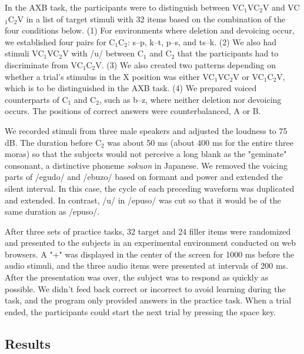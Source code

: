 \documentclass[a4paper,11pt,twocolumn]{article}
\begin{document}
In the AXB task, the participants were to distinguish between VC$_\text{1}$VC$_\text{2}$V and VC$_\text{1}$C$_\text{2}$V in a list of target stimuli with 32 items based on the combination of the four conditions below. (1) For environments where deletion and devoicing occur, we established four pairs for C$_\text{1}$C$_\text{2}$: s--p, k--t, p--s, and ts--k. (2) We also had stimuli VC$_\text{1}$VC$_\text{2}$V with /u/ between C$_\text{1}$ and C$_\text{2}$ that the participants had to discriminate from VC$_\text{1}$C$_\text{2}$V. (3) We also created two patterns depending on whether a trial's stimulus in the X position was either VC$_\text{1}$VC$_\text{2}$V or VC$_\text{1}$C$_\text{2}$V, which is to be distinguished in the AXB task. (4) We prepared voiced counterparts of C$_\text{1}$ and C$_\text{2}$, such as b--z, where neither deletion nor devoicing occurs. The positions of correct answers were counterbalanced, A or B.

We recorded stimuli from three male speakers and adjusted the loudness to 75 dB. The duration before C$_\text{2}$ was about 50 ms (about 400 ms for the entire three moras) so that the subjects would not perceive a long blank as the "geminate" consonant, a distinctive phoneme \textit{sokuon} in Japanese. We removed the voicing parts of /egudo/ and /ebuzo/ based on formant and power and extended the silent interval. In this case, the cycle of each preceding waveform was duplicated and extended. In contrast, /u/ in /epuso/ was cut so that it would be of the same duration as /epuso/.

After three sets of practice tasks, 32 target and 24 filler items were randomized and presented to the subjects in an experimental environment conducted on web browsers. A "+" was displayed in the center of the screen for 1000 ms before the audio stimuli, and the three audio items were presented at intervals of 200 ms. After the presentation was over, the subject was to respond as quickly as possible. We didn't feed back correct or incorrect to avoid learning during the task, and the program only provided answers in the practice task. When a trial ended, the participants could start the next trial by pressing the space key.

\subsection{Results}
\end{document}
